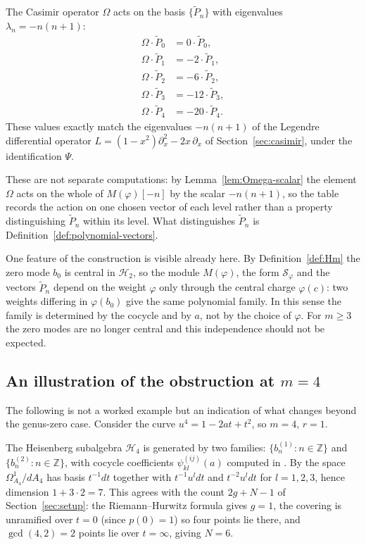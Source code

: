 \documentclass[12pt]{amsart}
\theoremstyle{plain}
\theoremstyle{definition}
\newcommand{\ZZ}{\mathbb{Z}}
\newcommand{\Mf}{M(\varphi)}          %
\newcommand{\Sf}{\mathcal{S}_\varphi} %
\newcommand{\Om}{\Omega}              %
\begin{document}
The Casimir operator $\Om$ acts on the basis $\{\tilde{P}_n\}$ with eigenvalues
$\lambda_n = -n(n+1)$:
\[
  \begin{aligned}
  \Om \cdot \tilde{P}_0 &= 0 \cdot \tilde{P}_0, \\
  \Om \cdot \tilde{P}_1 &= -2 \cdot \tilde{P}_1, \\
  \Om \cdot \tilde{P}_2 &= -6 \cdot \tilde{P}_2, \\
  \Om \cdot \tilde{P}_3 &= -12 \cdot \tilde{P}_3, \\
  \Om \cdot \tilde{P}_4 &= -20 \cdot \tilde{P}_4.
  \end{aligned}
\]
These values exactly match the eigenvalues $-n(n+1)$ of the Legendre differential operator
$L = (1-x^2)\partial_x^2 - 2x\,\partial_x$ of
Section~\ref{sec:casimir}, under the identification $\Psi$.

These are not separate computations: by
Lemma~\ref{lem:Omega-scalar} the element $\Om$ acts on the whole of
$\Mf[-n]$ by the scalar $-n(n+1)$, so the table records the action on
one chosen vector of each level rather than a property distinguishing
$\tilde{P}_n$ within its level. What distinguishes $\tilde{P}_n$ is
Definition~\ref{def:polynomial-vectors}.

One feature of the construction is visible already here. By
Definition~\ref{def:Hm} the zero mode $b_0$ is central in
$\mathcal{H}_2$, so the module $\Mf$, the form $\Sf$ and the vectors
$\tilde{P}_n$ depend on the weight $\varphi$ only through the central
charge $\varphi(c)$: two weights differing in $\varphi(b_0)$ give the
same polynomial family. In this sense the family is determined by the
cocycle and by $a$, not by the choice of $\varphi$. For $m \geq 3$ the
zero modes are no longer central and this independence should not be
expected.

\subsection{An illustration of the obstruction at $m = 4$}
\label{subsec:example-m4}

The following is not a worked example but an indication of what changes
beyond the genus-zero case. Consider the curve $u^4 = 1 - 2at + t^2$, so $m = 4$, $r = 1$.

The Heisenberg subalgebra $\mathcal{H}_4$ is generated by two families:
$\{b_n^{(1)} : n \in \ZZ\}$ and $\{b_n^{(2)} : n \in \ZZ\}$, with cocycle coefficients
$\psi_{kl}^{(ij)}(a)$ computed in \cite{SantosNeklyudovFutorny2025}. By
\cite[Thm.~1.1]{SantosNeklyudovFutorny2025} the space $\Omega^1_{A_4}/dA_4$ has basis
$t^{-1}dt$ together with $t^{-1}u^{l}dt$ and $t^{-2}u^{l}dt$ for $l = 1,2,3$, hence
dimension $1 + 3\cdot 2 = 7$. This agrees with the count $2g + N - 1$ of
Section~\ref{sec:setup}: the Riemann--Hurwitz formula gives $g = 1$,
the covering is unramified over $t = 0$ (since $p(0) = 1$) so four points lie there, and
$\gcd(4,2) = 2$ points lie over $t = \infty$, giving $N = 6$.
\end{document}
